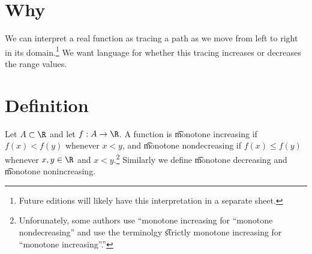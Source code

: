 

\section*{Why}

We can interpret a real function as tracing a path as we move from left to right in its domain.\footnote{Future editions will likely have this interpretation in a separate sheet.}
We want language for whether this tracing increases or decreases the range values.

\section*{Definition}

Let $A \subset \R $ and let $f: A \to \R $.
A function is \t{monotone increasing} if $f(x) < f(y)$ whenever $x < y$, and \t{monotone nondecreasing} if $f(x) \leq f(y)$ whenever $x, y \in \R $ and $x < y$.\footnote{Unforunately, some authors use ``monotone increasing for ``monotone nondecreasing'' and use the terminolgy \t{strictly monotone increasing} for ``monotone increasing''.''}
Similarly we define \t{monotone decreasing} and \t{monotone nonincreasing}.

\blankpage